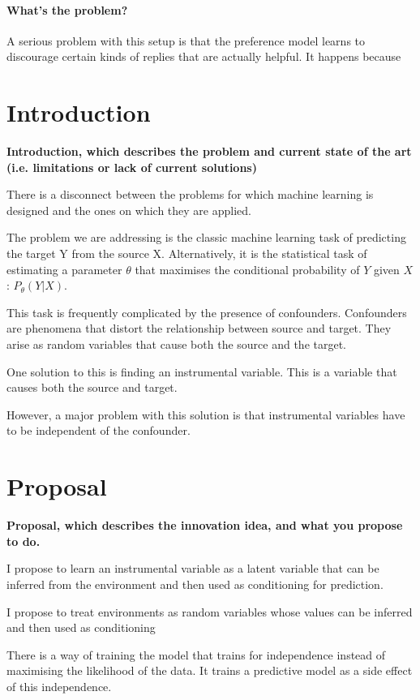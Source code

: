 \documentclass[
  journal=medium,
  manuscript=Qualcomm-Innovation-Fellowship-Proposal,
  year=22-February-2023,
]{cup-journal}
\begin{document}
\paragraph{What's the problem?} A serious problem with this setup is that the preference model learns to discourage certain kinds of replies that are actually helpful. It happens because 

\section{Introduction}

\textbf{Introduction, which describes the problem and current state of the art (i.e. limitations or lack of current solutions)}

There is a disconnect between the problems for which machine learning is designed and the ones on which they are applied.

The problem we are addressing is the classic machine learning task of predicting the target Y from the source X. Alternatively, it is the statistical task of estimating a parameter $\theta$ that maximises the conditional probability of $Y$ given $X$: $P_\theta(Y|X)$.

This task is frequently complicated by the presence of confounders. Confounders are phenomena that distort the relationship between source and target. They arise as random variables that cause both the source and the target.

One solution to this is finding an instrumental variable. This is a variable that causes both the source and target.

However, a major problem with this solution is that instrumental variables have to be independent of the confounder.

\section{Proposal}

\textbf{Proposal, which describes the innovation idea, and what you propose to do.}

I propose to learn an instrumental variable as a latent variable that can be inferred from the environment and then used as conditioning for prediction.

I propose to treat environments as random variables whose values can be inferred and then used as conditioning 

There is a way of training the model that trains for independence instead of maximising the likelihood of the data. It trains a predictive model as a side effect of this independence.
\end{document}
